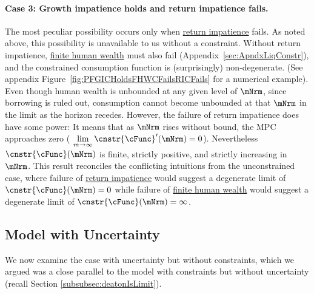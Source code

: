 \documentclass[\econtexRoot/BufferStockTheory]{subfiles}
\begin{document}
\hypertarget{RICandFHWCFail}{}
\paragraph{Case 3: Growth impatience holds and return impatience fails.} The most peculiar possibility occurs only when \hyperlink{RIC}{return impatience} fails.
As noted above, this possibility is unavailable to us without a constraint.
Without return impatience, \hyperlink{FHWC}{finite human wealth} must also fail (Appendix~\ref{sec:ApndxLiqConstr}), and the constrained consumption function is (surprisingly) non-degenerate.
(See appendix Figure~\ref{fig:PFGICHoldsFHWCFailsRICFails} for a numerical example).
Even though human wealth is unbounded at any given level of $\mNrm$, since borrowing is ruled out, consumption cannot become unbounded at that $\mNrm$ in the limit as the horizon recedes.
However, the failure of return impatience does have some power: It means that as $\mNrm$ rises without bound, the MPC approaches zero ( $\lim\limits_{m \rightarrow \infty} \cnstr{\cFunc}^{\prime}(\mNrm) = 0$).
Nevertheless $\cnstr{\cFunc}(\mNrm)$ is finite, strictly positive, and strictly increasing in $\mNrm$.
This result reconciles the conflicting intuitions from the unconstrained case, where failure of \hyperlink{RIC}{return impatience} would suggest a degenerate limit of $\cnstr{\cFunc}(\mNrm)=0$ while failure of \hyperlink{FHWC}{finite human wealth} would suggest a degenerate limit of $\cnstr{\cFunc}(\mNrm)=\infty$.





\hypertarget{model-with-uncertainty}{}
\subsection{Model with Uncertainty}\label{subsec:TheModelUncertainty}

We now examine the case with uncertainty but without constraints, which we argued was a close parallel to the model with constraints but without uncertainty (recall Section \ref{subsubsec:deatonIsLimit}).
\hypertarget{Calibration}{}


\hypertarget{Symbols}{}


\end{document}
